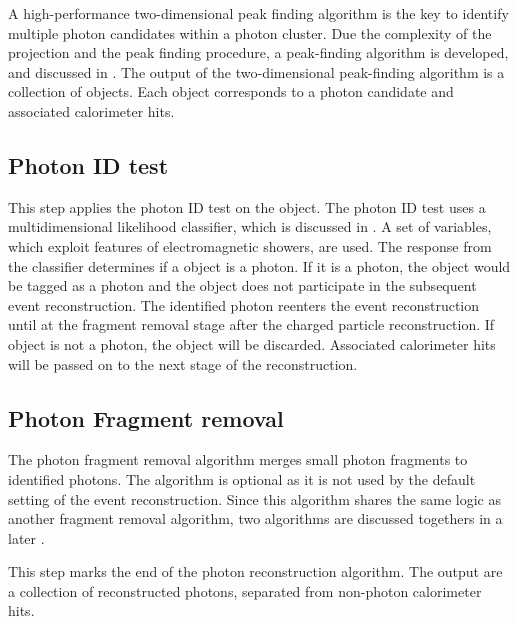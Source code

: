 A high-performance two-dimensional peak finding algorithm is the key to identify multiple photon candidates within a photon cluster. Due the complexity of the projection and the peak finding procedure, a peak-finding algorithm is developed, and discussed in . The output of the two-dimensional peak-finding algorithm is a collection of \ShowerPeak objects. Each \ShowerPeak object corresponds to a photon candidate and associated calorimeter hits.

\subsection{Photon ID test}
\label{sec:photonIDtest}

This step applies the photon ID test on the \ShowerPeak object. The photon ID test uses  a multidimensional likelihood classifier, which is discussed in . A set of variables, which exploit features of electromagnetic showers, are used. The response from the classifier determines if a \ShowerPeak object is a photon. If it is a photon, the \ShowerPeak object would be tagged as a photon and the \ShowerPeak object  does not participate in the subsequent event reconstruction. The identified photon reenters the event reconstruction until at the fragment removal stage after the charged particle reconstruction. If \ShowerPeak object  is not a photon, the \ShowerPeak object  will be discarded. Associated calorimeter hits will be passed on to the next stage of the reconstruction. 



\subsection{Photon Fragment removal}
\label{sec:photonRecoFragRemoval}

The  photon fragment removal algorithm merges small photon fragments to identified photons. The algorithm is optional as it is not used by the default setting of the event reconstruction. Since this algorithm shares the same logic as another fragment removal algorithm, two algorithms are discussed togethers in a later .


This step marks the end of the photon reconstruction algorithm. The output are a collection of reconstructed photons, separated from non-photon calorimeter hits. 


